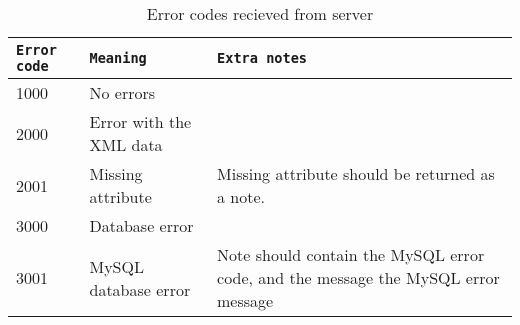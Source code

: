 \documentclass[titlepage, a4paper,10pt]{article}
\begin{document}
\begin{table}[h]
    \caption{Error codes recieved from server}
    \begin{tabular}{|l|l|p{5cm}|}
        \hline
        \texttt{Error code} & \texttt{Meaning} & \texttt{Extra notes} \\
        \hline
        \hline
        1000 & No errors & \\
        \hline
        \hline
        2000 & Error with the XML data & \\
        \hline
        2001 & Missing attribute & Missing attribute should be returned as a note. \\
        \hline
        \hline
        3000 & Database error & \\
        \hline
        3001 & MySQL database error & Note should contain the MySQL error code, and the message the MySQL error message \\
        \hline
    \end{tabular}
    \label{tbl:server_error_codes}
\end{table}
\end{document}
